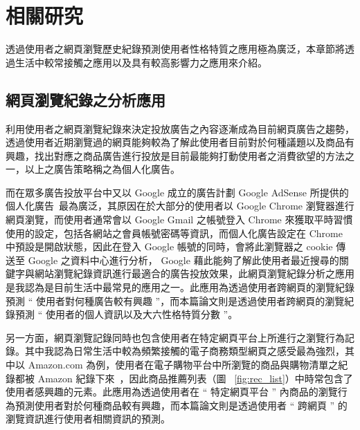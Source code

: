 \chapter{相關研究}
{透過使用者之網頁瀏覽歷史紀錄預測使用者性格特質之應用極為廣泛，本章節將透過生活中較常接觸之應用以及具有較高影響力之應用來介紹。}

\section{網頁瀏覽紀錄之分析應用}
{
利用使用者之網頁瀏覽紀錄來決定投放廣告之內容逐漸成為目前網頁廣告之趨勢，透過使用者近期瀏覽過的網頁能夠較為了解此使用者目前對於何種議題以及商品有興趣，找出對應之商品廣告進行投放是目前最能夠打動使用者之消費欲望的方法之一，以上之廣告策略稱之為個人化廣告。\par

而在眾多廣告投放平台中又以 Google 成立的廣告計劃 Google AdSense 所提供的個人化廣告~\cite{merriman1999method}最為廣泛，其原因在於大部分的使用者以 Google Chrome 瀏覽器進行網頁瀏覽，而使用者通常會以 Google Gmail 之帳號登入 Chrome 來獲取平時習慣使用的設定，包括各網站之會員帳號密碼等資訊，而個人化廣告設定在 Chrome 中預設是開啟狀態，因此在登入 Google 帳號的同時，會將此瀏覽器之 cookie 傳送至 Google 之資料中心進行分析， Google 藉此能夠了解此使用者最近搜尋的關鍵字與網站瀏覽紀錄資訊進行最適合的廣告投放效果，此網頁瀏覽紀錄分析之應用是我認為是目前生活中最常見的應用之一。此應用為透過使用者跨網頁的瀏覽紀錄預測 “ 使用者對何種廣告較有興趣 ”，而本篇論文則是透過使用者跨網頁的瀏覽紀錄預測 “ 使用者的個人資訊以及大六性格特質分數 ”。\par
\clearpage

另一方面，網頁瀏覽記錄同時也包含使用者在特定網頁平台上所進行之瀏覽行為記錄。其中我認為日常生活中較為頻繁接觸的電子商務類型網頁之感受最為強烈，其中以 {\se Amazon.com} 為例，使用者在電子購物平台中所瀏覽的商品與購物清單之紀錄都被 Amazon 紀錄下來~\cite{freno2015one}，因此商品推薦列表（圖 ~\ref{fig:rec_list}）中時常包含了使用者感興趣的元素。此應用為透過使用者在 “ 特定網頁平台 ” 內商品的瀏覽行為預測使用者對於何種商品較有興趣，而本篇論文則是透過使用者 “ 跨網頁 ” 的瀏覽資訊進行使用者相關資訊的預測。

}

